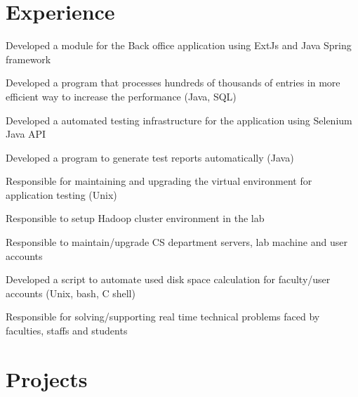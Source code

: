 \documentclass[]{main}
\begin{document}
\hfill
\begin{minipage}[t]{0.73\textwidth} 


\section{Experience}

\vspace{\topsep} %
\begin{tightemize}
\item Developed a module for the Back office application using ExtJs and Java Spring framework
\item Developed a program that processes hundreds of thousands of entries in more efficient way to increase the performance (Java, SQL)
\item Developed a automated testing infrastructure for the application using Selenium Java API
\item Developed a program to generate test reports automatically (Java)
\item Responsible for maintaining and upgrading the virtual environment for application testing (Unix)
\end{tightemize}
\sectionsep

\begin{tightemize}
\item Responsible to setup Hadoop cluster environment in the lab
\item Responsible to maintain/upgrade CS department servers, lab machine and user accounts
\item Developed a script to automate used disk space calculation for faculty/user accounts (Unix, bash, C shell)
\item Responsible for solving/supporting real time technical problems faced by faculties, staffs and students
\end{tightemize}
\sectionsep

\section{Projects}
\sectionsep


\end{minipage}
\end{document}
